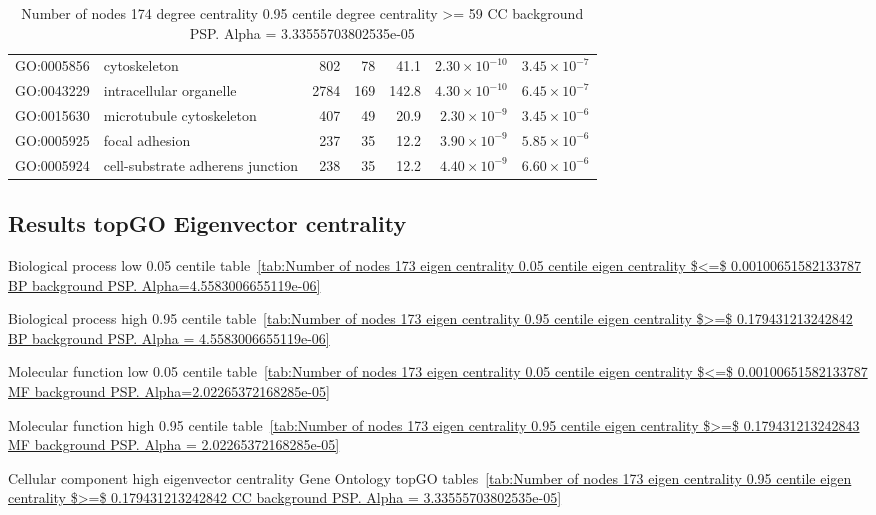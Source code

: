 \begin{table}[ht]
\begin{adjustbox}{max width=\textwidth}
\begin{tabular}{llrrrrr}
  GO:0005856 & cytoskeleton & 802 & 78 & 41.1 & $2.30 \times 10^{-10}$ & $3.45 \times 10^{-7}$ \\ 
  GO:0043229 & intracellular organelle & 2784 & 169 & 142.8 & $4.30 \times 10^{-10}$ & $6.45 \times 10^{-7}$ \\ 
  GO:0015630 & microtubule cytoskeleton & 407 & 49 & 20.9 & $2.30 \times 10^{-9}$ & $3.45 \times 10^{-6}$ \\ 
  GO:0005925 & focal adhesion & 237 & 35 & 12.2 & $3.90 \times 10^{-9}$ & $5.85 \times 10^{-6}$ \\ 
  GO:0005924 & cell-substrate adherens junction & 238 & 35 & 12.2 & $4.40 \times 10^{-9}$ & $6.60 \times 10^{-6}$ \\ 
   \hline
\end{tabular}
\end{adjustbox}
\caption{Number of nodes 174 degree centrality 0.95 centile  degree centrality >= 59 CC background PSP. Alpha = 3.33555703802535e-05} 
\label{tab:Number of nodes 174 degree centrality 0.95 centile  degree centrality >= 59 CC background PSP. Alpha = 3.33555703802535e-05}
\end{table}


    
    
\subsection{Results topGO Eigenvector centrality}


Biological process low 0.05 centile table~\ref{tab:Number of nodes 173 eigen centrality 0.05 centile  eigen centrality $<=$ 0.00100651582133787 BP background PSP. Alpha=4.5583006655119e-06}

Biological process high 0.95 centile table~\ref{tab:Number of nodes 173 eigen centrality 0.95 centile  eigen centrality $>=$ 0.179431213242842 BP background PSP. Alpha = 4.5583006655119e-06}

Molecular function low 0.05 centile table~\ref{tab:Number of nodes 173 eigen centrality 0.05 centile  eigen centrality $<=$ 0.00100651582133787 MF background PSP. Alpha=2.02265372168285e-05}

Molecular function high 0.95 centile table~\ref{tab:Number of nodes 173 eigen centrality 0.95 centile  eigen centrality $>=$ 0.179431213242843 MF background PSP. Alpha = 2.02265372168285e-05}

Cellular component high eigenvector centrality
Gene Ontology topGO
tables~\ref{tab:Number of nodes 173 eigen centrality 0.95 centile  eigen centrality $>=$ 0.179431213242842 CC background PSP. Alpha = 3.33555703802535e-05}

